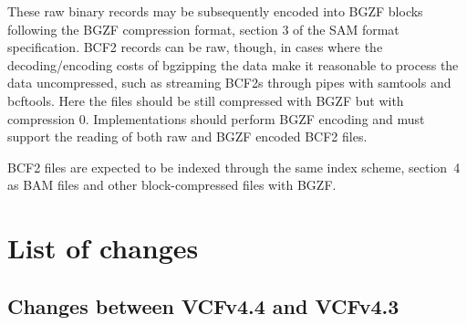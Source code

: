 \documentclass[8pt]{article}
\begin{document}
These raw binary records may be subsequently encoded into BGZF blocks following the BGZF compression format, section 3 of the SAM format specification.
BCF2 records can be raw, though, in cases where the decoding/encoding costs of bgzipping the data make it reasonable to process the data uncompressed, such as streaming BCF2s through pipes with samtools and bcftools.
Here the files should be still compressed with BGZF but with compression 0.
Implementations should perform BGZF encoding and must support the reading of both raw and BGZF encoded BCF2 files.

BCF2 files are expected to be indexed through the same index scheme, section~4 as BAM files and other block-compressed files with BGZF.

\section{List of changes}

\subsection{Changes between VCFv4.4 and VCFv4.3}
\end{document}
